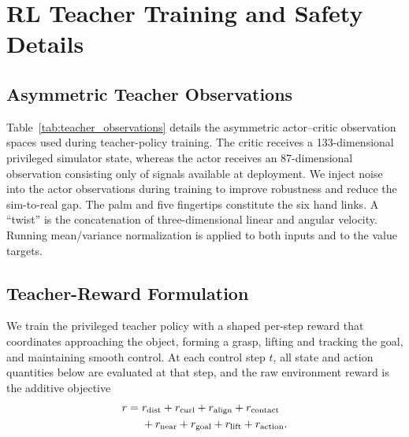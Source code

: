 \section{RL Teacher Training and Safety Details}
\label{app:rl_training_details}

\subsection{Asymmetric Teacher Observations}

Table~\ref{tab:teacher_observations} details the asymmetric actor--critic
observation spaces used during teacher-policy training. The critic receives a
133-dimensional privileged simulator state, whereas the actor receives an
87-dimensional observation consisting only of signals available at deployment.
We inject noise into the actor observations during training to improve
robustness and reduce the sim-to-real gap. The palm and five fingertips
constitute the six hand links. A ``twist'' is the concatenation of
three-dimensional linear and angular velocity. Running mean/variance
normalization is applied to both inputs and to the value targets.



\subsection{Teacher-Reward Formulation}
\label{app:exact_teacher_reward}

We train the privileged teacher policy with a shaped per-step reward that
coordinates approaching the object, forming a grasp, lifting and tracking the
goal, and maintaining smooth control.  At each control step $t$, all state and
action quantities below are evaluated at that step, and the raw environment
reward is the additive objective
\begin{align}
r={}&r_{\text{dist}}+r_{\text{curl}}+r_{\text{align}}
       +r_{\text{contact}}\notag\\
    &+r_{\text{near}}+r_{\text{goal}}+r_{\text{lift}}
       +r_{\text{action}}.
\label{eq:teacher_reward_total}
\end{align}

